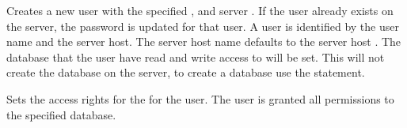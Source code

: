 
Creates a new user with the specified ,  and server .
If the user already exists on the server, the password is updated for that user.
A user is identified by the user name and the server host.
The server host name defaults to the server host .
The database that the user have read and write access to will be set. This will not create
the database on the server, to create a database use the  statement.


Sets the access rights for the  for the user. The user is granted 
all permissions to the specified database.
